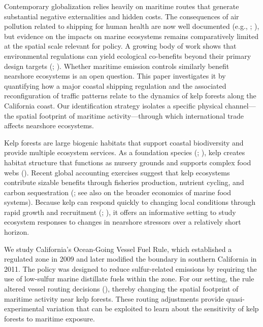 \documentclass[12pt]{article}
\begin{document}
Contemporary globalization relies heavily on maritime routes that generate substantial negative externalities and hidden costs. The consequences of air pollution related to shipping for human health are now well documented (e.g., \citealp{Klotz2022}; \citealp{HansenLewis2022}), but evidence on the impacts on marine ecosystems remains comparatively limited at the spatial scale relevant for policy. A growing body of work shows that environmental regulations can yield ecological co-benefits beyond their primary design targets (\citealp{ShapiroWalker2018}; \citealp{KeiserShapiro2019}). Whether maritime emission controls similarly benefit nearshore ecosystems is an open question. This paper investigates it by quantifying how a major coastal shipping regulation and the associated reconfiguration of traffic patterns relate to the dynamics of kelp forests along the California coast. Our identification strategy isolates a specific physical channel---the spatial footprint of maritime activity---through which international trade affects nearshore ecosystems.

Kelp forests are large biogenic habitats that support coastal biodiversity and provide multiple ecosystem services. As a foundation species (\citealp{Paine1969}; \citealp{Hale2018}), kelp creates habitat structure that functions as nursery grounds and supports complex food webs (\citealp{Christie2009}). Recent global accounting exercises suggest that kelp ecosystems contribute sizable benefits through fisheries production, nutrient cycling, and carbon sequestration (\citealp{Eger2023}; see also \citealp{Costello2020} on the broader economics of marine food systems). Because kelp can respond quickly to changing local conditions through rapid growth and recruitment (\citealp{Krumhansl2016}; \citealp{Carr2019}), it offers an informative setting to study ecosystem responses to changes in nearshore stressors over a relatively short horizon.

We study California's Ocean-Going Vessel Fuel Rule, which established a regulated zone in 2009 and later modified the boundary in southern California in 2011. The policy was designed to reduce sulfur-related emissions by requiring the use of low-sulfur marine distillate fuels within the zone. For our setting, the rule altered vessel routing decisions (\citealp{Klotz2022}), thereby changing the spatial footprint of maritime activity near kelp forests. These routing adjustments provide quasi-experimental variation that can be exploited to learn about the sensitivity of kelp forests to maritime exposure.
\end{document}
